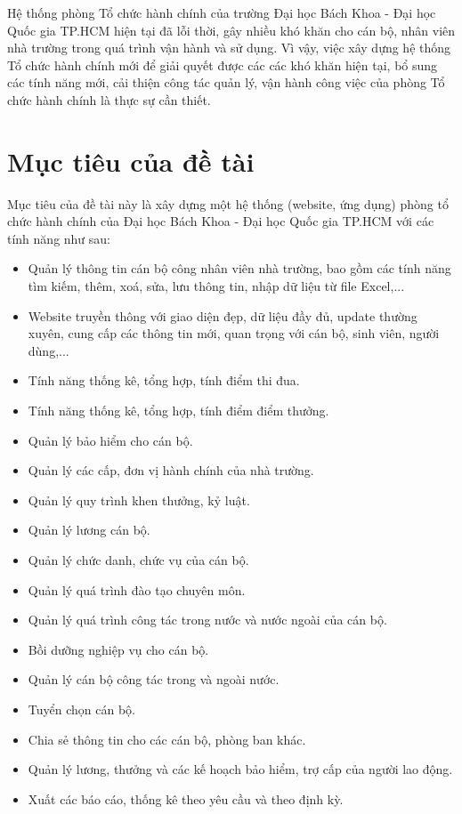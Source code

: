 Hệ thống phòng Tổ chức hành chính của trường Đại học Bách Khoa - Đại học Quốc gia TP.HCM hiện tại đã lỗi thời, gây nhiều khó khăn cho cán bộ, nhân viên nhà trường trong quá trình vận hành và sử dụng. Vì vậy, việc xây dựng hệ thống Tổ chức hành chính mới để giải quyết được các các khó khăn hiện tại, bổ sung các tính năng mới, cải thiện công tác quản lý, vận hành công việc của phòng Tổ chức hành chính là thực sự cần thiết.
    
\section{Mục tiêu của đề tài}
Mục tiêu của đề tài này là xây dựng một hệ thống (website, ứng dụng) phòng tổ chức hành chính của Đại học Bách Khoa - Đại học Quốc gia TP.HCM với các tính năng như sau:

\begin{itemize}
    \item Quản lý thông tin cán bộ công nhân viên nhà trường, bao gồm các tính năng tìm kiếm, thêm, xoá, sửa, lưu thông tin, nhập dữ liệu từ file Excel,...
    \item Website truyền thông với giao diện đẹp, dữ liệu đầy đủ, update thường xuyên, cung cấp các thông tin mới, quan trọng với cán bộ, sinh viên, người dùng,... 
    \item Tính năng thống kê, tổng hợp, tính điểm thi đua.
    \item Tính năng thống kê, tổng hợp, tính điểm điểm thưởng.
    \item Quản lý bảo hiểm cho cán bộ.
    \item Quản lý các cấp, đơn vị hành chính của nhà trường.
    \item Quản lý quy trình khen thưởng, kỷ luật.
    \item Quản lý lương cán bộ.
    \item Quản lý chức danh, chức vụ của cán bộ.
    \item Quản lý quá trình đào tạo chuyên môn.
    \item Quản lý quá trình công tác trong nước và nước ngoài của cán bộ.
    \item Bồi dưỡng nghiệp vụ cho cán bộ.
    \item Quản lý cán bộ công tác trong và ngoài nước.
    \item Tuyển chọn cán bộ.
    \item Chia sẻ thông tin cho các cán bộ, phòng ban khác.
    \item Quản lý lương, thưởng và các kế hoạch bảo hiểm, trợ cấp của người lao động.
    \item Xuất các báo cáo, thống kê theo yêu cầu và theo định kỳ.
\end{itemize}
